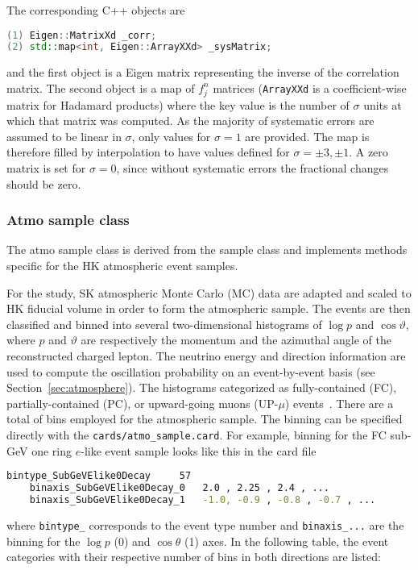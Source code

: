 \documentclass[a4paper, 11pt]{article}
\newcommand{\refsec}[1]{Section~\ref{#1}}
\begin{document}
The corresponding C++ objects are
\begin{lstlisting}[language=C++]
(1) Eigen::MatrixXd _corr;
(2) std::map<int, Eigen::ArrayXXd> _sysMatrix;
\end{lstlisting}
and the first object is a Eigen matrix representing the inverse of the correlation matrix.
The second object is a map of $f_j^n$ matrices (\texttt{ArrayXXd} is a coefficient-wise matrix for Hadamard products) %
where the key value is the number of $\sigma$ units at which that matrix was computed.
As the majority of systematic errors are assumed to be linear in $\sigma$, only values for $\sigma = 1$ are provided.
The map is therefore filled by interpolation to have values defined for $\sigma = \pm3, \pm1$.
A zero matrix is set for $\sigma = 0$, since without systematic errors the fractional changes should be zero.

\subsubsection{Atmo sample class}
\label{sec:atmo_sample}

The atmo sample class is derived from the sample class and implements methods specific for the HK atmospheric event samples.

For the study, SK atmospheric Monte Carlo (MC) data are adapted and scaled to HK fiducial volume in order to form the atmospheric sample.
The events are then classified and binned into several two-dimensional histograms of $\log p$ and $\cos\vartheta$, %
where $p$ and $\vartheta$ are respectively the momentum and the azimuthal angle of the reconstructed charged lepton.
The neutrino energy and direction information are used to compute the oscillation probability on an event-by-event basis (see \refsec{sec:atmosphere}).
The histograms categorized as fully-contained (FC), %
partially-contained (PC), or upward-going muons (UP-$\mu$) events~\cite{Jiang:2019xwn}.
There are a total of  bins employed for the atmospheric sample.
The binning can be specified directly with the \texttt{cards/atmo\_sample.card}.
For example, binning for the FC sub-GeV one ring $e$-like event sample looks like this in the card file
\begin{lstlisting}[language=bash]
    bintype_SubGeVElike0Decay	  57
    binaxis_SubGeVElike0Decay_0	  2.0 , 2.25 , 2.4 , ...
    binaxis_SubGeVElike0Decay_1	  -1.0, -0.9 , -0.8 , -0.7 , ...
\end{lstlisting}
where \texttt{bintype\_} corresponds to the event type number and \texttt{binaxis\_...} are the binning %
for the $\log p$ (0) and $\cos \theta$ (1) axes.
In the following table, the event categories with their respective number of bins in both directions are listed:
\end{document}
